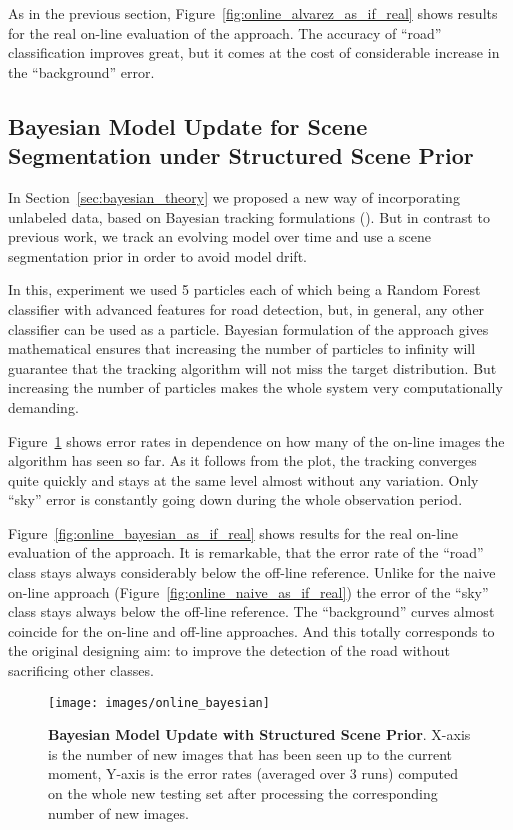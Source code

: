 As in the previous section, Figure~\ref{fig:online_alvarez_as_if_real} shows results for the real on-line evaluation of the approach. The accuracy of
``road'' classification improves great, but it comes at the cost of considerable increase in the ``background'' error.


\subsection{Bayesian Model Update for Scene Segmentation under Structured Scene Prior}
\label{subsec:bayesian_model}

In Section~\ref{sec:bayesian_theory} we proposed a new way of incorporating unlabeled data, based on Bayesian tracking formulations (\cite{Isard1998}).
But in contrast to previous work, we track an evolving model over time and use a scene segmentation prior in order to avoid model drift.

In this, experiment we used 5 particles each of which being a Random Forest classifier with advanced features for road detection, but, in general,
any other classifier can be used as a particle. Bayesian formulation of the approach gives mathematical ensures that increasing the number of 
particles to infinity will guarantee that the tracking algorithm will not miss the target distribution. But increasing the number of particles makes
the whole system very computationally demanding.

Figure~\ref{fig:online_bayesian} shows error rates in dependence on how many of the on-line images the algorithm has seen so far.
As it follows from the plot, the tracking converges quite quickly and stays at the same level almost without any variation. Only ``sky''
error is constantly going down during the whole observation period.

Figure~\ref{fig:online_bayesian_as_if_real} shows results for the real on-line evaluation of the approach. It is remarkable, that the error rate of 
the ``road'' class stays always considerably below the off-line reference. Unlike for the naive on-line approach (Figure~\ref{fig:online_naive_as_if_real})
the error of the ``sky'' class stays always below the off-line reference. The ``background'' curves almost coincide for the on-line and off-line approaches.
And this totally corresponds to the original designing aim: to improve the detection of the road without sacrificing other classes.

\begin{figure}[ht]
 \centering
 \texttt{[image: images/online\_bayesian]}
 \caption[Bayesian Model Update with Structured Scene Prior]{
 {\bf Bayesian Model Update with Structured Scene Prior}.
  X-axis is the number of new images that has been seen up to the current moment, Y-axis is the error rates (averaged over 3 runs)
  computed on the whole new testing set after processing the corresponding number of new images.
 }
 \label{fig:online_bayesian}
\end{figure}

